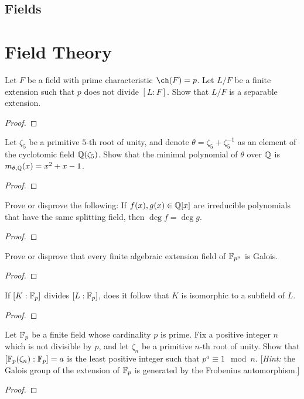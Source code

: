\section{Fields}
\chapter{Field Theory}
\begin{problem}
  Let $F$ be a field with prime characteristic $\ch(F)=p$. Let
  $L/F$ be a finite extension such that $p$ does not
  divide $[L:F]$. Show that $L/F$ is a separable
  extension.
\begin{proof}
\end{proof}
\end{problem}

\begin{problem}
  Let $\zeta_5$ be a primitive $5$-th root of unity, and denote
  $\theta=\zeta_5+\zeta_5^{-1}$ as an element of the cyclotomic
  field $\mathbb{Q}(\zeta_5)$. Show that the minimal polynomial of
  $\theta$ over $\mathbb{Q}$ is $m_{\theta,\mathbb{Q}}(x)=x^2+x-1$.
\begin{proof}
\end{proof}
\end{problem}

\begin{problem}
  Prove or disprove the following: If $f(x),g(x)\in\mathbb{Q}[x]$ are
  irreducible polynomials that have the same splitting field,
  then $\deg f=\deg g$.
\begin{proof}
\end{proof}
\end{problem}

\begin{problem}
  Prove or disprove that every finite algebraic extension field
  of $\mathbb{F}_{p^n}$ is Galois.
\begin{proof}
\end{proof}
\end{problem}

\begin{problem}
  If $[K:\mathbb{F}_p]$ divides $[L:\mathbb{F}_p]$, does it
  follow that $K$ is isomorphic to a subfield of $L$.
\begin{proof}
\end{proof}
\end{problem}

\begin{problem}
  Let $\mathbb{F}_p$ be a finite field whose cardinality $p$ is
  prime. Fix a positive integer $n$ which is not divisible by
  $p$, and let $\zeta_n$ be a primitive $n$-th root of
  unity. Show that $[\mathbb{F}_p(\zeta_n):\mathbb{F}_p]=a$ is
  the least positive integer such that $p^a\equiv 1\mod
  n$. [\emph{Hint:} the Galois group of the extension of
  $\mathbb{F}_p$ is generated by the Frobenius automorphism.]
\begin{proof}

\end{proof}
\end{problem}

